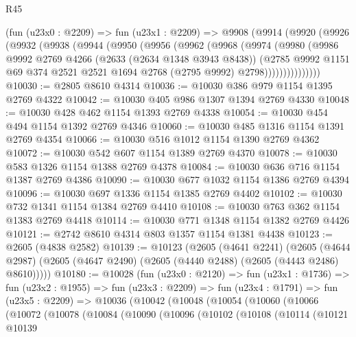 \begin{lexlean}{R45}
\begin{coremodule}
    (fun (u23x0 : @2209) =>
    fun (u23x1 : @2209) =>
    @9908
      (@9914
        (@9920
          (@9926
            (@9932
              (@9938
                (@9944
                  (@9950
                    (@9956
                      (@9962
                        (@9968
                          (@9974
                            (@9980
                              (@9986
                                @9992
                                @2769
                                @4266
                                (@2633 (@2634 @1348 @3943 @8438))
                                (@2785
                                  @9992
                                  @1151
                                  @69
                                  @374
                                  @2521
                                  @2521
                                  @1694
                                  @2768
                                  (@2795 @9992)
                                  @2798)))))))))))))))
@10030 := @2805 @8610 @4314
@10036 := @10030 @386 @979 @1154 @1395 @2769 @4322
@10042 := @10030 @405 @986 @1307 @1394 @2769 @4330
@10048 := @10030 @428 @462 @1154 @1393 @2769 @4338
@10054 := @10030 @454 @494 @1154 @1392 @2769 @4346
@10060 := @10030 @485 @1316 @1154 @1391 @2769 @4354
@10066 := @10030 @516 @1012 @1154 @1390 @2769 @4362
@10072 := @10030 @542 @607 @1154 @1389 @2769 @4370
@10078 := @10030 @583 @1326 @1154 @1388 @2769 @4378
@10084 := @10030 @636 @716 @1154 @1387 @2769 @4386
@10090 := @10030 @677 @1032 @1154 @1386 @2769 @4394
@10096 := @10030 @697 @1336 @1154 @1385 @2769 @4402
@10102 := @10030 @732 @1341 @1154 @1384 @2769 @4410
@10108 := @10030 @763 @362 @1154 @1383 @2769 @4418
@10114 := @10030 @771 @1348 @1154 @1382 @2769 @4426
@10121 := @2742 @8610 @4314 @803 @1357 @1154 @1381 @4438
@10123 := @2605 (@4838 @2582)
@10139 := @10123
    (@2605
      (@4641 @2241)
      (@2605 (@4644 @2987) (@2605 (@4647 @2490) (@2605 (@4440 @2488) (@2605 (@4443 @2486) @8610)))))
@10180 := @10028
    (fun (u23x0 : @2120) =>
    fun (u23x1 : @1736) =>
    fun (u23x2 : @1955) =>
    fun (u23x3 : @2209) =>
    fun (u23x4 : @1791) =>
    fun (u23x5 : @2209) =>
    @10036
      (@10042
        (@10048
          (@10054
            (@10060
              (@10066
                (@10072
                  (@10078
                    (@10084
                      (@10090
                        (@10096
                          (@10102
                            (@10108
                              (@10114
                                (@10121
                                  @10139

\end{coremodule}
\end{lexlean}
